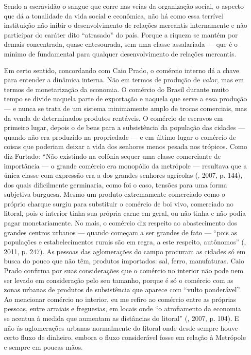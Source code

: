Sendo a escravidão o sangue que corre nas veias da organização social, o
aspecto que dá a tonalidade da vida social e econômica, não há como essa
terrível instituição não inibir o desenvolvimento de relações mercantis
internamente e não participar do caráter dito ``atrasado'' do país.
Porque a riqueza se mantém por demais concentrada, quase entesourada,
sem uma classe assalariada --- que é o mínimo de fundamental para
qualquer desenvolvimento de relações mercantis.

Em certo sentido, concordando com Caio Prado, o comércio interno dá a
chave para entender a dinâmica interna. Não em termos de produção de
\emph{valor}, mas em termos de monetarização da economia. O comércio do
Brasil durante muito tempo se divide naquela parte de exportação e
naquela que serve a essa produção --- e nunca se trata de um sistema
minimamente amplo de trocas comerciais, mas da venda de determinados
produtos rentáveis. O comércio de escravos em primeiro lugar, depois o
de bens para a subsistência da população das cidades --- quando não era
produzido na propriedade --- e em último lugar o comércio de coisas que
poderiam deixar a vida dos senhores menos pesada nos trópicos. Como diz
Furtado: ``Não existindo na colônia sequer uma classe comerciante de
importância --- o grande comércio era monopólio da metrópole --- resultava
que a única classe com expressão era a dos grandes senhores agrícolas
(, 2007, p. 144), dos quais dificilmente germinaria, como foi o
caso, tensões para uma forma subjetiva burguesa. Mesmo um produto
extremamente comerciado como o próprio charque surgiu para substituir o
comércio de boi vivo, comerciado no litoral, pois o interior tinha sua
própria carne em geral, ou não tinha e não podia pagar monetariamente.
No mais, o comércio diz respeito ao abastecimento dos grandes centros
urbanos --- quando começam a ser grandes de fato --- ``pois as populações
e estabelecimentos rurais são em regra, a este respeito, autônomos''
(, 2011, p. 247). As pessoas das aglomerações do campo procuram as
cidades só em busca do pouco que não têm, produtos importados: sal,
ferro, manufaturas. Caio Prado confirma por suas considerações que o
comércio no interior não pode nem ser levado em consideração pelo seu
tamanho, porque é só o comércio com as zonas urbanas de produtos de
subsistência que aparece com ``vulto ponderável''. Ao mencionar comércio
no interior, eu me refiro ao comércio entre as próprias pessoas, entre
arraiais e freguesias, em locais onde ``o atrofiamento da economia se
acentua à medida que aumentam as distâncias do litoral'' (, 2007,
p. 104). E não às aglomerações urbanas normalmente do litoral onde desde
sempre houve certo fluxo de dinheiro, embora o fluxo considerável fosse
em relação à Metrópole e sempre em poucas mãos.

